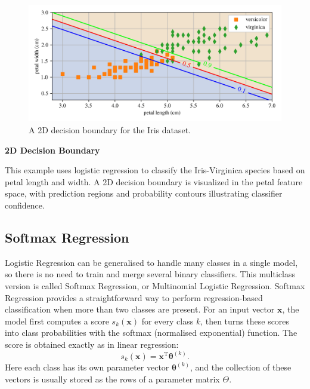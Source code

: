 \documentclass[12pt,letter]{article}
\begin{document}
		\begin{figure}[H]
			\centering
			\includegraphics[width=6.2in]{../figures/Iris_dataset_decision_boundary_2D.png}
			\vspace{-3ex}
			\caption{A 2D decision boundary for the Iris dataset.}
			\label{fig:Iris_dataset_decision_boundary_2D}
		\end{figure}

\pagebreak

\begin{example}
\textbf{2D Decision Boundary}

\noindent This example uses logistic regression to classify the Iris-Virginica species based on petal length and width. A 2D decision boundary is visualized in the petal feature space, with prediction regions and probability contours illustrating classifier confidence.
\end{example}



\subsection{Softmax Regression}

Logistic Regression can be generalised to handle many classes in a single model, so there is no need to train and merge several binary classifiers. This multiclass version is called Softmax Regression, or Multinomial Logistic Regression. Softmax Regression provides a straightforward way to perform regression-based classification when more than two classes are present. For an input vector $\mathbf{x}$, the model first computes a score $s_k(\mathbf{x})$ for every class $k$, then turns these scores into class probabilities with the softmax (normalised exponential) function. The score is obtained exactly as in linear regression:
\begin{equation}
s_k(\textbf{x}) = \textbf{x}^\text{T}\pmb{\theta}^{(k)}.
\end{equation}
Here each class has its own parameter vector $\boldsymbol{\theta}^{(k)}$, and the collection of these vectors is usually stored as the rows of a parameter matrix $\Theta$.
\end{document}
